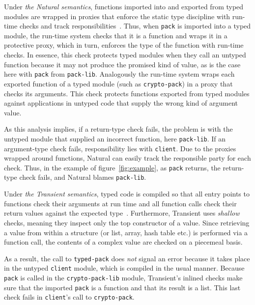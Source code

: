 Under {\it the Natural semantics\/}, functions imported into and exported from
typed modules are wrapped in proxies that enforce the static type discipline
with run-time checks and track responsibilities~\cite{tf-popl-2008,
tfffgksst-snapl-2017}. Thus, when {\tt pack} is imported into a typed module,
the run-time system checks that it is a function and wraps it in a protective
proxy, which in turn, enforces the type of the function with run-time checks.
In essence, this check protects typed modules when they call an untyped function
because it may not produce the promised kind of value, as is the case here with
{\tt pack} from {\tt pack-lib}. Analogously the run-time system wraps each exported
function of a typed module (such as {\tt crypto-pack}) in a proxy that checks
its arguments.  This check protects functions exported from typed modules against
applications in untyped code that supply the wrong kind of argument value.

As this analysis implies, if a return-type check fails, the problem is with
the untyped module that supplied an incorrect function, here {\tt pack-lib}. If
an argument-type check fails, responsibility lies with {\tt client}. Due to the
proxies wrapped around functions, Natural can easily track the responsible party
for each check. Thus, in the example of figure~\ref{fig:example}, as
\texttt{pack} returns, the return-type check fails, and Natural blames
\texttt{pack-lib}.

Under {\it the Transient semantics\/}, typed code is compiled so that all entry
points to functions check their arguments at run time and all function calls
check their return values against the expected type~\cite{vss-popl-2017}.
Furthermore, Transient uses \emph{shallow} checks, meaning they inspect only the
top constructor of a value. Since retrieving a value from within a structure (or
list, array, hash table etc.) is performed via a function call, the contents of a
complex value are checked on a piecemeal basis.

As a result, the call to \texttt{typed-pack} does {\em not\/} signal an error
because it takes place in the untyped {\tt client} module, which is compiled in
the usual manner. Because {\tt pack} is called in the {\tt crypto-pack-lib}
module, Transient's inlined checks make sure that the imported
\texttt{pack} is a function and that its result is a list. This
last check fails in \texttt{client}'s call to {\tt crypto-pack}.

